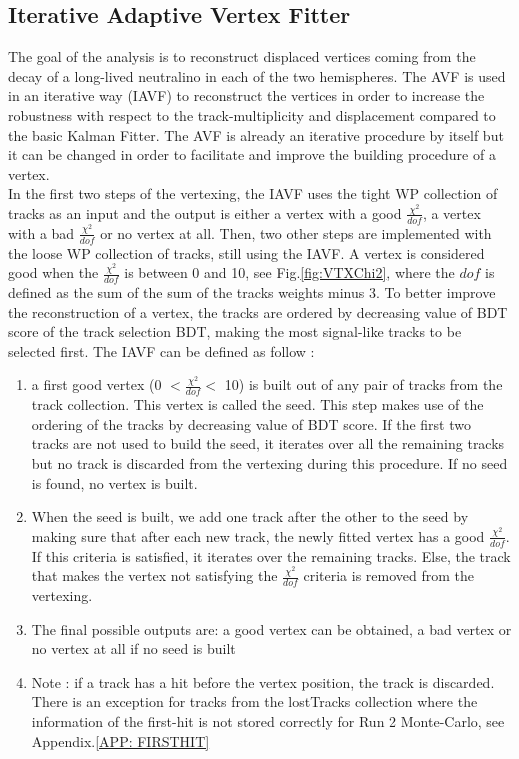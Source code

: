 \documentclass{cernatlasnote}
\begin{document}
\subsection{Iterative Adaptive Vertex Fitter}
\label{APP: IAVF}
The goal of the analysis is to reconstruct displaced vertices coming from the decay of a long-lived neutralino in each of the two hemispheres. The AVF is used in an iterative way (IAVF) to reconstruct the vertices in order to increase the robustness with respect to the track-multiplicity and displacement compared to the basic Kalman Fitter. The AVF is already an iterative procedure by itself but it can be changed in order to facilitate and improve the building procedure of a vertex. \\
In the first two steps of the vertexing, the IAVF uses the tight WP collection of tracks as an input and the output is either a vertex with a good $\frac{\chi^2}{dof}$, a vertex with a bad $\frac{\chi^2}{dof}$ or no vertex at all. Then, two other steps are implemented with the loose WP collection of tracks, still using the IAVF. A vertex is considered good when the 
$\frac{\chi^2}{dof}$ is between 0 and 10, see Fig.\ref{fig:VTXChi2}, where the $dof$ is defined as the sum of the sum of the tracks weights minus 3. To better improve the reconstruction of a vertex, the tracks are ordered by decreasing value of BDT score of the track selection BDT, making the most signal-like tracks to be selected first. The IAVF can be defined as follow :
\begin{enumerate}
    \item a first good  vertex (0 $<\frac{\chi^2}{dof}<$ 10) is built out of any pair of tracks from the track collection. This vertex is called the seed. This step makes use of the ordering of the tracks by decreasing value of BDT score. If the first two tracks are not used to build the seed, it iterates over all the remaining tracks but no track is discarded from the vertexing during this procedure. If no seed is found, no vertex is built.
    \item When the seed is built, we add one track after the other to the seed by making sure that after each new track, the newly fitted vertex has a good $\frac{\chi^2}{dof}$. If this criteria is satisfied, it iterates over the remaining tracks. Else, the track that makes the vertex not satisfying the $\frac{\chi^2}{dof}$ criteria is removed from the vertexing.
    \item The final possible outputs are: a good vertex can be obtained, a bad vertex or no vertex at all if no seed is built
    \item Note : if a track has a hit before the vertex position, the track is discarded. There is an exception for tracks from the lostTracks collection where the information of the first-hit is not stored correctly for Run 2 Monte-Carlo, see Appendix.\ref{APP: FIRSTHIT} 
\end{enumerate}
\end{document}
